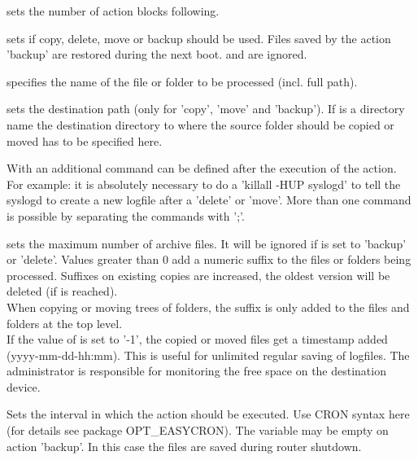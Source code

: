 \begin{description}
   sets the number of action blocks following.\\



  sets if copy, delete, move or backup should be used.
  Files saved by the action 'backup' are restored during the next boot.  
  and  are ignored.\\
 

  specifies the name of the file or folder to be processed (incl. full path).\\
  

  sets the destination path (only for 'copy', 'move' and 'backup').
  If  is a directory name the destination
  directory to where the source folder should be copied or moved has to be
  specified here.\\


  With  an additional command can be defined after the 
  execution of the action. For example: it is absolutely necessary to do a 
  'killall -HUP syslogd' to tell the syslogd to create a new logfile after a 
  'delete' or 'move'. More than one command is possible by separating the commands 
  with ';'.\\


  sets the maximum number of archive files. It will be ignored if
   is set to 'backup' or 'delete'. Values greater than 0 
  add a numeric suffix to the files or folders being processed.
  Suffixes on existing copies are increased, the oldest version will be deleted (if
   is reached).\\
  When copying or moving trees of folders, the suffix is only added to the files and 
  folders at the top level.\\
  If the value of  is set to '-1', the copied or moved
  files get a timestamp added (yyyy-mm-dd-hh:mm). This is useful for unlimited regular
  saving of logfiles. The administrator is responsible for monitoring the free space
  on the destination device. 


   Sets the interval in which the action should be executed.
  Use CRON syntax here (for details see package OPT\_EASYCRON). The variable may be empty
  on action 'backup'. In this case the files are saved during router shutdown.\\

\end{description}
  

